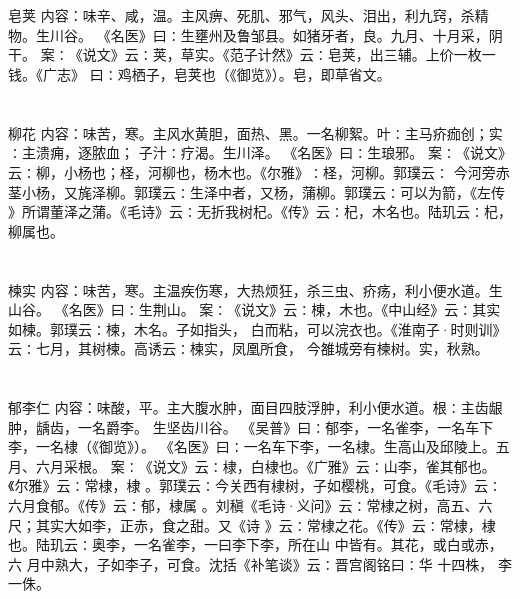 \documentclass[12pt,UTF8]{ctexbook}
\begin{document}
\section{}皂荚
内容：味辛、咸，温。主风痹、死肌、邪气，风头、泪出，利九窍，杀精物。生川谷。 
《名医》曰∶生壅州及鲁邹县。如猪牙者，良。九月、十月采，阴干。 
案∶《说文》云∶荚，草实。《范子计然》云∶皂荚，出三辅。上价一枚一钱。《广志》 
曰∶鸡栖子，皂荚也（《御览》）。皂，即草省文。 


\section{}柳花
内容：味苦，寒。主风水黄胆，面热、黑。一名柳絮。叶∶主马疥痂创；实∶主溃痈，逐脓血； 
子汁∶疗渴。生川泽。 
《名医》曰∶生琅邪。 
案∶《说文》云∶柳，小杨也；柽，河柳也，杨木也。《尔雅》∶柽，河柳。郭璞云∶ 
今河旁赤茎小杨，又旄泽柳。郭璞云∶生泽中者，又杨，蒲柳。郭璞云∶可以为箭，《左传 
》所谓董泽之蒲。《毛诗》云∶无折我树杞。《传》云∶杞，木名也。陆玑云∶杞，柳属也。 


\section{}楝实
内容：味苦，寒。主温疾伤寒，大热烦狂，杀三虫、疥疡，利小便水道。生山谷。 
《名医》曰∶生荆山。 
案∶《说文》云∶楝，木也。《中山经》云∶其实如楝。郭璞云∶楝，木名。子如指头， 
白而粘，可以浣衣也。《淮南子·时则训》云∶七月，其树楝。高诱云∶楝实，凤凰所食， 
今雒城旁有楝树。实，秋熟。 


\section{}郁李仁
内容：味酸，平。主大腹水肿，面目四肢浮肿，利小便水道。根∶主齿龈肿，龋齿，一名爵李。 
生坚齿川谷。 
《吴普》曰∶郁李，一名雀李，一名车下李，一名棣（《御览》）。 
《名医》曰∶一名车下李，一名棣。生高山及邱陵上。五月、六月采根。 
案∶《说文》云∶棣，白棣也。《广雅》云∶山李，雀其郁也。《尔雅》云∶常棣，棣 
。郭璞云∶今关西有棣树，子如樱桃，可食。《毛诗》云∶六月食郁。《传》云∶郁，棣属 
。刘稹《毛诗·义问》云∶常棣之树，高五、六尺；其实大如李，正赤，食之甜。又《诗 
》云∶常棣之花。《传》云∶常棣，棣也。陆玑云∶奥李，一名雀李，一曰李下李，所在山 
中皆有。其花，或白或赤，六 
月中熟大，子如李子，可食。沈括《补笔谈》云∶晋宫阁铭曰∶华 
十四株， 李一侏。 
\end{document}
